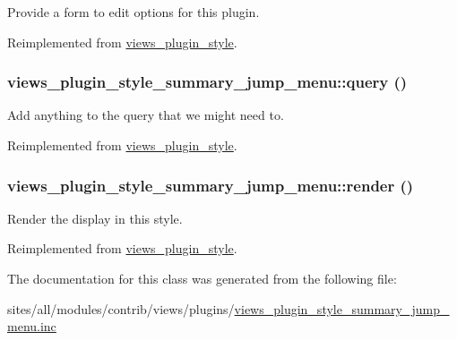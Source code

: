 Provide a form to edit options for this plugin. 

Reimplemented from \hyperlink{classviews__plugin__style_fe3d437ff4398315b15c4e60975dbb1c}{views\_\-plugin\_\-style}.\hypertarget{classviews__plugin__style__summary__jump__menu_ee2a45ee02a7ce8d041a5b028758cf0b}{
\subsubsection[{query}]{\setlength{\rightskip}{0pt plus 5cm}views\_\-plugin\_\-style\_\-summary\_\-jump\_\-menu::query ()}}
\label{classviews__plugin__style__summary__jump__menu_ee2a45ee02a7ce8d041a5b028758cf0b}


Add anything to the query that we might need to. 

Reimplemented from \hyperlink{classviews__plugin__style_f6b601d8f42cc3d86721fcad76eaae4b}{views\_\-plugin\_\-style}.\hypertarget{classviews__plugin__style__summary__jump__menu_7e9b8b44735067dc7ebb838e54a21a38}{
\subsubsection[{render}]{\setlength{\rightskip}{0pt plus 5cm}views\_\-plugin\_\-style\_\-summary\_\-jump\_\-menu::render ()}}
\label{classviews__plugin__style__summary__jump__menu_7e9b8b44735067dc7ebb838e54a21a38}


Render the display in this style. 

Reimplemented from \hyperlink{classviews__plugin__style_a52b618e91b11a7d10ad1feadbc891f1}{views\_\-plugin\_\-style}.

The documentation for this class was generated from the following file:\begin{CompactItemize}
\item 
sites/all/modules/contrib/views/plugins/\hyperlink{views__plugin__style__summary__jump__menu_8inc}{views\_\-plugin\_\-style\_\-summary\_\-jump\_\-menu.inc}\end{CompactItemize}
